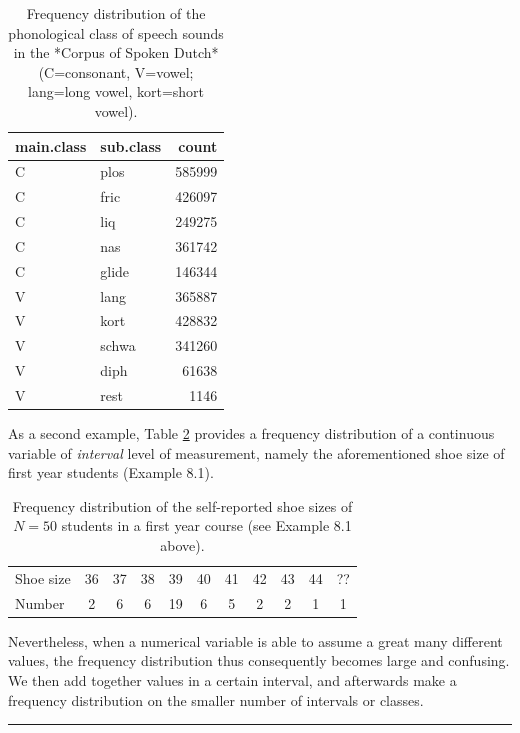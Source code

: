 \documentclass[
]{book}
\begin{document}
\begin{table}

\caption{\label{tab:klankfreq}Frequency distribution 
              of the phonological class of speech sounds
              in the *Corpus of Spoken Dutch* 
              (C=consonant, V=vowel; lang=long vowel, kort=short vowel).}
\centering
\begin{tabular}[t]{llr}
\toprule
main.class & sub.class & count\\
\midrule
C & plos & 585999\\
C & fric & 426097\\
C & liq & 249275\\
C & nas & 361742\\
C & glide & 146344\\
\addlinespace
V & lang & 365887\\
V & kort & 428832\\
V & schwa & 341260\\
V & diph & 61638\\
V & rest & 1146\\
\bottomrule
\end{tabular}
\end{table}

As a second example, Table \ref{tab:shoesize} provides a
frequency distribution of a continuous variable of \emph{interval}
level of measurement, namely the aforementioned shoe size
of first year students (Example 8.1).

\begin{longtable}[]{@{}lcccccccccc@{}}
\caption{\label{tab:shoesize} Frequency distribution of the self-reported shoe sizes of \(N=50\) students in a first year course (see Example 8.1 above).}\tabularnewline
\toprule
\endhead
Shoe size & 36 & 37 & 38 & 39 & 40 & 41 & 42 & 43 & 44 & ?? \\
Number & 2 & 6 & 6 & 19 & 6 & 5 & 2 & 2 & 1 & 1 \\
\bottomrule
\end{longtable}

Nevertheless, when a numerical variable is able to assume a great many different
values, the frequency distribution thus consequently becomes large and confusing.
We then add together values in a certain interval,
and afterwards make a frequency distribution on the smaller number
of intervals or classes.

\begin{center}\rule{0.5\linewidth}{0.5pt}\end{center}
\end{document}

